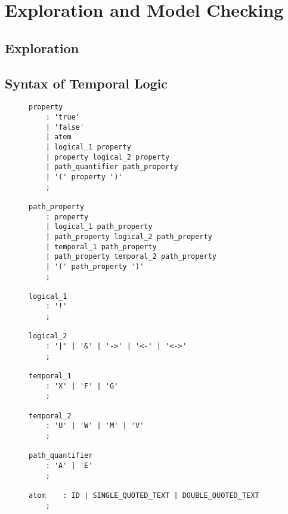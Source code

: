 \section{Exploration and Model Checking}

\subsection{Exploration}

\subsection{Syntax of Temporal Logic}
\begin{figure}
\begin{lstlisting}[label=lst:logic,caption={Grammar of Temporal Logic}]
property
	: 'true'
	| 'false'
	| atom
	| logical_1 property
	| property logical_2 property
	| path_quantifier path_property
	| '(' property ')'
	;

path_property
	: property
	| logical_1 path_property
	| path_property logical_2 path_property
	| temporal_1 path_property
	| path_property temporal_2 path_property
	| '(' path_property ')'
	;

logical_1
	: '!'
	;

logical_2
	: '|' | '&' | '->' | '<-' | '<->'
	;

temporal_1
	: 'X' | 'F' | 'G'
	;

temporal_2
	: 'U' | 'W' | 'M' | 'V'
	;

path_quantifier
	: 'A' | 'E'
	;

atom	: ID | SINGLE_QUOTED_TEXT | DOUBLE_QUOTED_TEXT
	;
\end{lstlisting}
\end{figure}

\newcommand{\Aop}{\mathop{\mathsf{A}}}
\newcommand{\Eop}{\mathop{\mathsf{E}}}
\newcommand{\Xop}{\mathop{\mathsf{X}}}
\newcommand{\Fop}{\mathop{\mathsf{F}}}
\newcommand{\Gop}{\mathop{\mathsf{G}}}
\newcommand{\Uop}{\mathbin{\mathsf{U}}}
\newcommand{\Wop}{\mathbin{\mathsf{W}}}
\newcommand{\Mop}{\mathbin{\mathsf{M}}}
\newcommand{\Vop}{\mathbin{\mathsf{V}}}

